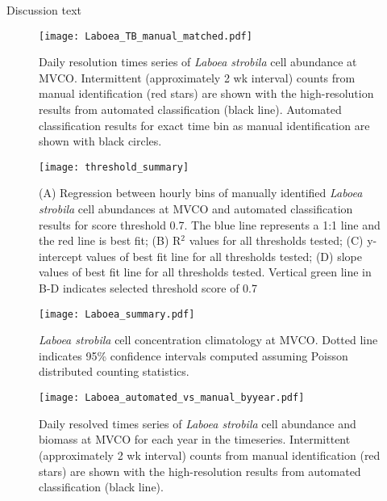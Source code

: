 Discussion text

\newpage
\begin{figure}

\graphicspath{ {Chapter3_Figures/} }
\texttt{[image: Laboea\_TB\_manual\_matched.pdf]}
\caption [Comparison between automated and manual classification for \textit{Laboea strobila}] {Daily resolution times series of \textit{Laboea strobila} cell abundance at MVCO. Intermittent (approximately 2 wk interval) counts from manual identification (red stars) are shown with the high-resolution results from automated classification (black line). Automated classification results for exact time bin as manual identification are shown with black circles.}
\end{figure}

\graphicspath{ {Chapter3_Figures/} }
\begin{figure}
\texttt{[image: threshold\_summary]}
\caption [ Indicators for optimal threshold use in automated image classification] {(A) Regression between hourly bins of manually identified  \textit{Laboea strobila} cell abundances at MVCO and automated
classification results for score threshold 0.7. The blue line represents a 1:1 line and the red line is best fit; (B) R$^{2}$ values for all thresholds tested; (C) y-intercept values of best fit line for all thresholds tested; (D) slope values of best fit line for all thresholds tested. Vertical green line in B-D indicates selected threshold score of 0.7}
\end{figure}

\graphicspath{ {Chapter3_Figures/} }
\begin{figure}
\texttt{[image: Laboea\_summary.pdf]}
\caption [\textit{Laboea strobila} climatology] {\textit{Laboea strobila} cell concentration climatology at MVCO. Dotted line indicates 95\% confidence intervals computed assuming Poisson distributed counting statistics.}
\end{figure}

\graphicspath{ {Chapter3_Figures/} }
\begin{figure}
\texttt{[image: Laboea\_automated\_vs\_manual\_byyear.pdf]}
\caption [\textit{Laboea strobila} cell concentration and biomass by year] {Daily resolved times series of \textit{Laboea strobila} cell abundance and biomass at MVCO for each year in the timeseries. Intermittent (approximately 2 wk interval) counts from manual identification (red stars) are shown with the high-resolution results from automated classification (black line).}
\end{figure}

